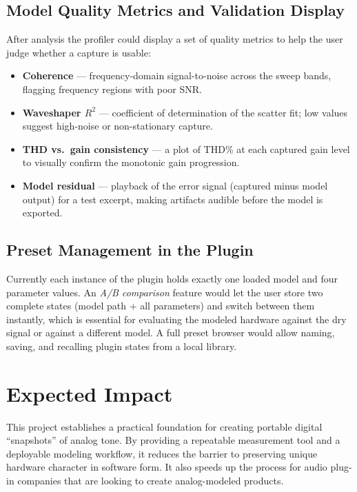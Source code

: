 \documentclass[11pt, letterpaper]{article}
\begin{document}
\subsection{Model Quality Metrics and Validation Display}

After analysis the profiler could display a set of quality metrics to help the
user judge whether a capture is usable:
\begin{itemize}[leftmargin=1.5em]
    \item \textbf{Coherence} — frequency-domain signal-to-noise across the
          sweep bands, flagging frequency regions with poor SNR.
    \item \textbf{Waveshaper $R^2$} — coefficient of determination of the
          scatter fit; low values suggest high-noise or non-stationary capture.
    \item \textbf{THD vs.\ gain consistency} — a plot of THD\% at each
          captured gain level to visually confirm the monotonic gain progression.
    \item \textbf{Model residual} — playback of the error signal (captured
          minus model output) for a test excerpt, making artifacts audible
          before the model is exported.
\end{itemize}

\subsection{Preset Management in the Plugin}

Currently each instance of the plugin holds exactly one loaded model and four
parameter values.  An \emph{A/B comparison} feature would let the user store
two complete states (model path + all parameters) and switch between them
instantly, which is essential for evaluating the modeled hardware against the
dry signal or against a different model.  A full preset browser would allow
naming, saving, and recalling plugin states from a local library.

\section{Expected Impact}
\label{sec:impact}

This project establishes a practical foundation for creating portable digital ``snapshots'' of analog
tone. By providing a repeatable measurement tool and a deployable modeling workflow, it reduces
the barrier to preserving unique hardware character in software form. It also speeds up the process
for audio plug-in companies that are looking to create analog-modeled products.
\end{document}
